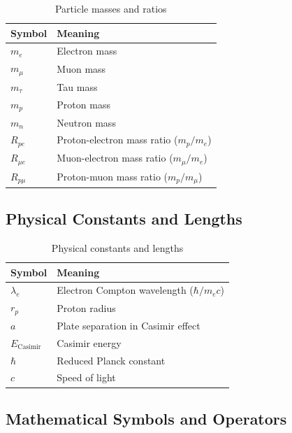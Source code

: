 	\begin{table}[htbp]
		\centering
		\begin{tabular}{p{3cm}p{9cm}}
			\toprule
			\textbf{Symbol} & \textbf{Meaning} \\
			\midrule
			$m_e$ & Electron mass \\
			$m_{\mu}$ & Muon mass \\
			$m_{\tau}$ & Tau mass \\
			$m_p$ & Proton mass \\
			$m_n$ & Neutron mass \\
			$R_{pe}$ & Proton-electron mass ratio ($m_p/m_e$) \\
			$R_{\mu e}$ & Muon-electron mass ratio ($m_{\mu}/m_e$) \\
			$R_{p\mu}$ & Proton-muon mass ratio ($m_p/m_{\mu}$) \\
			\bottomrule
		\end{tabular}
		\caption{Particle masses and ratios}
	\end{table}
	
	\subsection{Physical Constants and Lengths}
	
	\begin{table}[htbp]
		\centering
		\begin{tabular}{p{3cm}p{9cm}}
			\toprule
			\textbf{Symbol} & \textbf{Meaning} \\
			\midrule
			$\lambda_e$ & Electron Compton wavelength ($\hbar/m_e c$) \\
			$r_p$ & Proton radius \\
			$a$ & Plate separation in Casimir effect \\
			$E_{\text{Casimir}}$ & Casimir energy \\
			$\hbar$ & Reduced Planck constant \\
			$c$ & Speed of light \\
			\bottomrule
		\end{tabular}
		\caption{Physical constants and lengths}
	\end{table}
	
	\subsection{Mathematical Symbols and Operators}
	
